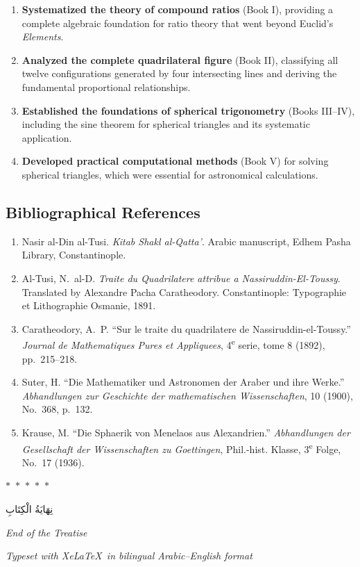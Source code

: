\documentclass[11pt,a4paper]{article}
\theoremstyle{plain}
\theoremstyle{definition}
\theoremstyle{remark}
\newcommand{\ar}[1]{{\arabicfont\beginR #1\endR}}
\newcommand{\dblornament}{\begin{center}\textcolor{goldaccent}{$\ast$~$\ast$~$\ast$~$\ast$~$\ast$}\end{center}}
\begin{document}
\begin{enumerate}[leftmargin=2em]
\item \textbf{Systematized the theory of compound ratios} (Book I), providing a
complete algebraic foundation for ratio theory that went beyond Euclid's
\textit{Elements}.
\item \textbf{Analyzed the complete quadrilateral figure} (Book II), classifying
all twelve configurations generated by four intersecting lines and deriving
the fundamental proportional relationships.
\item \textbf{Established the foundations of spherical trigonometry} (Books
III--IV), including the sine theorem for spherical triangles and its systematic
application.
\item \textbf{Developed practical computational methods} (Book V) for solving
spherical triangles, which were essential for astronomical calculations.
\end{enumerate}

\subsection*{Bibliographical References}

\begin{enumerate}[leftmargin=2em]
\item Nasir al-Din al-Tusi. \textit{Kitab Shakl al-Qatta'}. Arabic manuscript,
Edhem Pasha Library, Constantinople.
\item Al-Tusi, N.~al-D. \textit{Traite du Quadrilatere attribue a
Nassiruddin-El-Toussy}. Translated by Alexandre Pacha Caratheodory.
Constantinople: Typographie et Lithographie Osmanie, 1891.
\item Caratheodory, A.~P. ``Sur le traite du quadrilatere de
Nassiruddin-el-Toussy.'' \textit{Journal de Mathematiques Pures et
Appliquees}, 4\textsuperscript{e} serie, tome 8 (1892), pp.~215--218.
\item Suter, H. ``Die Mathematiker und Astronomen der Araber und ihre Werke.''
\textit{Abhandlungen zur Geschichte der mathematischen Wissenschaften}, 10
(1900), No.~368, p.~132.
\item Krause, M. ``Die Sphaerik von Menelaos aus Alexandrien.''
\textit{Abhandlungen der Gesellschaft der Wissenschaften zu Goettingen},
Phil.-hist. Klasse, 3\textsuperscript{e} Folge, No.~17 (1936).
\end{enumerate}

\vspace{1cm}
\begin{center}
\dblornament\par\vspace{0.5cm}
{\small\ar{نِهَايَةُ الْكِتَابِ}}\par\vspace{0.3cm}
{\small\textit{End of the Treatise}}\par\vspace{0.3cm}
{\small\textit{Typeset with XeLaTeX\ in bilingual Arabic--English format}}
\end{center}
\end{document}
